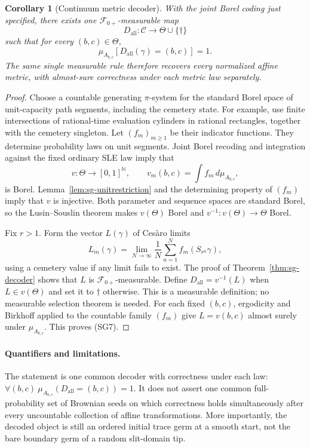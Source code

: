 \documentclass[11pt]{article}
\newtheorem{corollary}[theorem]{Corollary}
\theoremstyle{definition}\newtheorem{definition}[theorem]{Definition}
\theoremstyle{remark}\newtheorem{remark}[theorem]{Remark}
\begin{document}
\begin{corollary}[Continuum metric decoder]
\label{cor:sg-continuum}
With the joint Borel coding just specified, there exists one
$\mathcal F_{0+}$-measurable map
\[
 D_{\mathrm{all}}:\mathcal C\longrightarrow\Theta\cup\{\dagger\}
\]
such that for every $(b,c)\in\Theta$,
\[
 \mu_{A_{b,c}}[D_{\mathrm{all}}(\gamma)=(b,c)]=1.
 \tag{SG7}
\]
The same single measurable rule therefore recovers every normalized affine
metric, with almost-sure correctness under each metric law separately.
\end{corollary}
\begin{proof}
Choose a countable generating $\pi$-system for the standard Borel space of
unit-capacity path segments, including the cemetery state. For example, use
finite intersections of rational-time evaluation cylinders in rational
rectangles, together with the cemetery singleton. Let $(f_m)_{m\geq1}$ be
their indicator functions. They determine probability laws on unit segments.
Joint Borel recoding and integration against the fixed ordinary SLE law imply
that
\[
 v:\Theta\to[0,1]^{\mathbb N},\qquad
 v_m(b,c)=\int f_m\,d\mu_{A_{b,c}},
 \tag{SG8}
\]
is Borel. Lemma~\ref{lem:sg-unitrestriction} and the determining property
of $(f_m)$ imply that $v$ is injective.
Both parameter and sequence spaces are standard Borel, so the Lusin--Souslin
theorem makes $v(\Theta)$ Borel and $v^{-1}:v(\Theta)\to\Theta$ Borel.

Fix $r>1$. Form the vector $L(\gamma)$ of Ces\`aro limits
\[
 L_m(\gamma)=\lim_{N\to\infty}\frac1N\sum_{n=1}^N
 f_m(S_{r^n}\gamma),
\]
using a cemetery value if any limit fails to exist. The proof of
Theorem~\ref{thm:sg-decoder} shows that $L$ is
$\mathcal F_{0+}$-measurable. Define
$D_{\mathrm{all}}=v^{-1}(L)$ when $L\in v(\Theta)$ and set it to
$\dagger$ otherwise. This is a measurable definition; no measurable
selection theorem is needed.
For each fixed $(b,c)$, ergodicity and Birkhoff applied to the countable
family $(f_m)$ give $L=v(b,c)$ almost surely under $\mu_{A_{b,c}}$.
This proves (SG7).
\end{proof}

\paragraph{Quantifiers and limitations.}
The statement is one common decoder with correctness under each law:
$\forall(b,c)\ \mu_{A_{b,c}}(D_{\mathrm{all}}=(b,c))=1$.
It does not assert one common full-probability set of Brownian seeds on
which correctness holds simultaneously after every uncountable collection
of affine transformations. More importantly, the decoded object is still
an ordered initial trace germ at a smooth start, not the bare boundary germ
of a random slit-domain tip.
\end{document}
